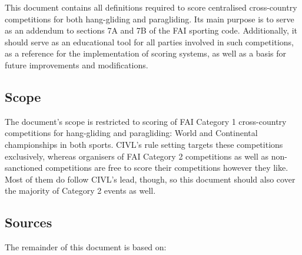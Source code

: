 \documentclass[../gap.tex]{civl}
\begin{document}
This document contains all definitions required to score centralised
cross-country competitions for both hang-gliding and paragliding. Its main
purpose is to serve as an addendum to sections 7A and 7B of the FAI sporting
code. Additionally, it should serve as an educational tool for all parties
involved in such competitions, as a reference for the implementation of scoring
systems, as well as a basis for future improvements and modifications.

\subsection{Scope}
The document’s scope is restricted to scoring of FAI Category 1 cross-country
competitions for hang-gliding and paragliding: World and Continental
championships in both sports. CIVL’s rule setting targets these competitions
exclusively, whereas organisers of FAI Category 2 competitions as well as
non-sanctioned competitions are free to score their competitions however they
like. Most of them do follow CIVL’s lead, though, so this document should also
cover the majority of Category 2 events as well.

\subsection{Sources}
The remainder of this document is based on:
\end{document}
